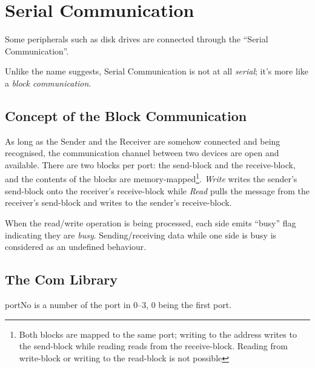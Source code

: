 \chapter{Serial Communication}

Some peripherals such as disk drives are connected through the ``Serial Communication''.

Unlike the name suggests, Serial Communication is not at all \emph{serial}; it's more like a \emph{block communication}.

\section{Concept of the Block Communication}

As long as the Sender and the Receiver are somehow connected and being recognised, the communication channel between two devices are open and available. There are two blocks per port: the send-block and the receive-block, and the contents of the blocks are memory-mapped\footnote{Both blocks are mapped to the same port; writing to the address writes to the send-block while reading reads from the receive-block. Reading from write-block or writing to the read-block is not possible}. \emph{Write} writes the sender's send-block onto the receiver's receive-block while \emph{Read} pulls the message from the receiver's send-block and writes to the sender's receive-block.

When the read/write operation is being processed, each side emits ``busy'' flag indicating they are \emph{busy}. Sending/receiving data while one side is busy is considered as an undefined behaviour.


\section{The Com Library}

portNo is a number of the port in 0--3, 0 being the first port.


